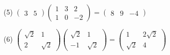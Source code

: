 \documentclass[fleqn]{jsarticle}
\begin{document}
\begin{description}
\begin{spacing}{1.2}
            \item[(5)]
                $ \left(
                    \begin{array}{cc}
                        3 & 5
                    \end{array}
                \right)
                \left(
                    \begin{array}{ccc}
                        1 & 3 & 2 \\
                        1 & 0 & -2
                    \end{array}
                \right)
                =
                \left(
                    \begin{array}{ccc}
                        8 & 9 & -4
                    \end{array}
                \right) $ \\

            \item[(6)]
                $ \left(
                    \begin{array}{cc}
                        \sqrt{2} & 1 \\
                        2 & \sqrt{2}
                    \end{array}
                \right)
                \left(
                    \begin{array}{cc}
                        \sqrt{2} & 1 \\
                        -1 & \sqrt{2}
                    \end{array}
                \right)
                =
                \left(
                    \begin{array}{cc}
                        1 & 2\sqrt{2} \\
                        \sqrt{2} & 4
                    \end{array}
                \right) $ \\

        \end{spacing}
    \end{description}
\end{document}
